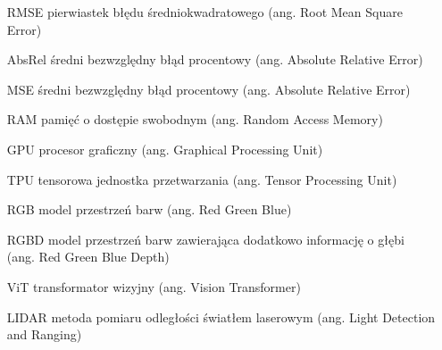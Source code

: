 \flushleft



\begin{itemize}[noitemsep,topsep=0pt,parsep=0pt,partopsep=0pt,labelwidth=3cm,align=left,itemindent=3cm]
\item[RMSE] pierwiastek błędu średniokwadratowego (ang. Root Mean Square Error)
    \item[AbsRel] średni bezwzględny błąd procentowy (ang. Absolute Relative Error)
    \item[MSE] średni bezwzględny błąd procentowy (ang. Absolute Relative Error)
    \item[RAM] pamięć o dostępie swobodnym (ang. Random Access Memory)
    \item[GPU] procesor graficzny (ang. Graphical Processing Unit)
    \item[TPU] tensorowa jednostka przetwarzania (ang. Tensor Processing Unit)
    \item[RGB] model przestrzeń barw (ang. Red Green Blue)
    \item[RGBD] model przestrzeń barw zawierająca dodatkowo informację o głębi (ang. Red Green Blue Depth)
    \item[ViT] transformator wizyjny (ang. Vision Transformer)
    \item[LIDAR] metoda pomiaru odległości światłem laserowym (ang. Light Detection and Ranging)
\end{itemize}

